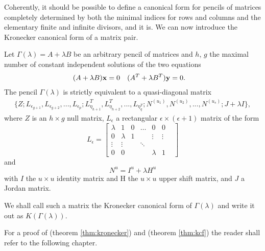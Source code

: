 Coherently, it should be possible to define a canonical form for pencils of matrices completely determined by both
the minimal indices for rows and columns and the elementary finite and infinite divisors, and it is. We can now introduce
the Kronecker canonical form of a matrix pair.

\begin{theorem}\label{thm:kcf}
    Let \(\Gamma(\lambda) = A + \lambda B\) be an arbitrary pencil of matrices and \(h\), \(g\) the maximal number of constant
    independent solutions of the two equations
    \begin{align*}
        (A + \lambda B)\vb{x} &= 0 & (A^T + \lambda B^T)\vb{y} &= 0.
    \end{align*}
    The pencil \(\Gamma(\lambda)\) is strictly equivalent to a quasi-diagonal matrix
    \begin{gather*}
        \{
            Z;
            L_{\epsilon_{g+1}}, L_{\epsilon_{g+2}}, ..., L_{\epsilon_{p}};
            L_{\eta_{h+1}}^T, L_{\eta_{h+2}}^T, ..., L_{\eta_{q}^T};
            N^{(u_{1})}, N^{(u_{2})}, ..., N^{(u_{s})};
            J + \lambda I
        \},
    \end{gather*}
    where \(Z\) is an \(h \times g\) null matrix, \(L_{\epsilon}\) a rectangular \(\epsilon \times (\epsilon + 1)\) matrix of
    the form
    \[
        L_{\epsilon} =
        \begin{bmatrix}
            \lambda        &      1     &       0      &     \ldots       &    0       &    0   \\
            0              & \lambda    &       1      &                  & \vdots     & \vdots \\
            \vdots         & \vdots     &     & \ddots    &      &            &        \\
            0              &      0     &              &                  & \lambda    &    1   
        \end{bmatrix}
    \]
    and
    \[
        N^u = I^u + \lambda H^u
    \]
    with \(I\) the \(u \times u\) identity matrix and H the \(u \times u\) upper shift matrix, and \(J\) a Jordan matrix.

    We shall call such a matrix the Kronecker canonical form of \(\Gamma(\lambda)\) and write it
    out as \(K(\Gamma(\lambda))\).
\end{theorem}

For a proof of  (theorem \ref{thm:kronecker}) and  (theorem \ref{thm:kcf})
the reader shall refer to the following chapter.

